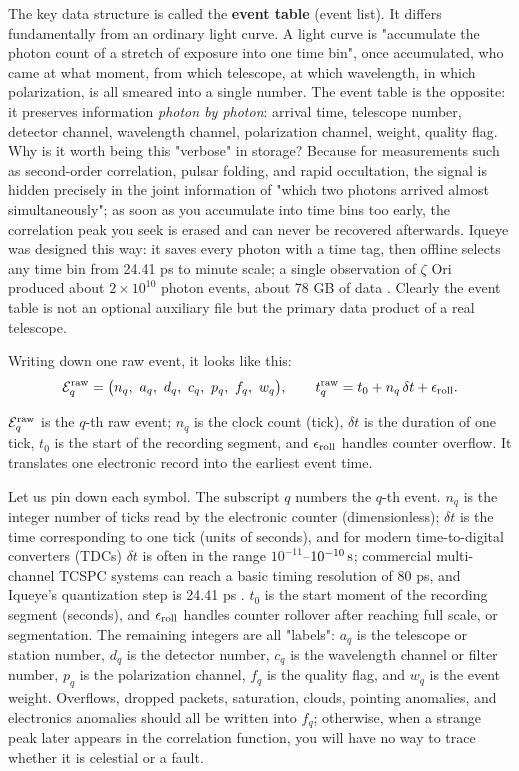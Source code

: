 The key data structure is called the \textbf{event table} (event list). It differs fundamentally from an ordinary light curve. A light curve is "accumulate the photon count of a stretch of exposure into one time bin", once accumulated, who came at what moment, from which telescope, at which wavelength, in which polarization, is all smeared into a single number. The event table is the opposite: it preserves information \emph{photon by photon}: arrival time, telescope number, detector channel, wavelength channel, polarization channel, weight, quality flag. Why is it worth being this "verbose" in storage? Because for measurements such as second-order correlation, pulsar folding, and rapid occultation, the signal is hidden precisely in the joint information of "which two photons arrived almost simultaneously"; as soon as you accumulate into time bins too early, the correlation peak you seek is erased and can never be recovered afterwards. Iqueye was designed this way: it saves every photon with a time tag, then offline selects any time bin from 24.41 ps to minute scale; a single observation of $\zeta$ Ori produced about $2\times10^{10}$ photon events, about 78 GB of data \citep{2009A&A...508..531N,2019CoSka..49...85Z}. Clearly the event table is not an optional auxiliary file but the primary data product of a real telescope.

Writing down one raw event, it looks like this:
\begin{equation}
  \mathcal{E}^{\rm raw}_q =
  \big(n_q,\ a_q,\ d_q,\ c_q,\ p_q,\ f_q,\ w_q\big),
  \qquad
  t^{\rm raw}_q=t_0+n_q\,\delta t+\epsilon_{\rm roll}.
  \label{eq:e13-raw-event}
\end{equation}
\begin{formulaexplain}
$\mathcal E_q^{\rm raw}$ is the $q$-th raw event; $n_q$ is the clock count (tick), $\delta t$ is the duration of one tick, $t_0$ is the start of the recording segment, and $\epsilon_{\rm roll}$ handles counter overflow. It translates one electronic record into the earliest event time.
\end{formulaexplain}
Let us pin down each symbol. The subscript $q$ numbers the $q$-th event. $n_q$ is the integer number of ticks read by the electronic counter (dimensionless); $\delta t$ is the time corresponding to one tick (units of seconds), and for modern time-to-digital converters (TDCs) $\delta t$ is often in the range $10^{-11}$--$10^{-10}\,{\rm s}$; commercial multi-channel TCSPC systems can reach a basic timing resolution of 80 ps, and Iqueye's quantization step is 24.41 ps \citep{2009A&A...508..531N,2020RScI...91a3108W}. $t_0$ is the start moment of the recording segment (seconds), and $\epsilon_{\rm roll}$ handles counter rollover after reaching full scale, or segmentation. The remaining integers are all "labels": $a_q$ is the telescope or station number, $d_q$ is the detector number, $c_q$ is the wavelength channel or filter number, $p_q$ is the polarization channel, $f_q$ is the quality flag, and $w_q$ is the event weight. Overflows, dropped packets, saturation, clouds, pointing anomalies, and electronics anomalies should all be written into $f_q$; otherwise, when a strange peak later appears in the correlation function, you will have no way to trace whether it is celestial or a fault.

